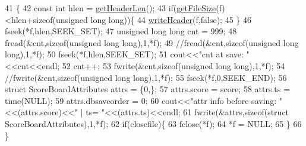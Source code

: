 \begin{DoxyCode}
41                                                                                 \{
42                 \textcolor{keyword}{const} \textcolor{keywordtype}{int} hlen = \hyperlink{class_tetris_1_1_d_b_management_1_1_d_b_manager2_acac0c763f7ff5fe5c5eda0c83e0b41bd}{getHeaderLen}();
43                 \textcolor{keywordflow}{if}(\hyperlink{class_tetris_1_1_d_b_management_1_1_d_b_manager2_a0ad4e60d498caefce46d9917f7593c9e}{getFileSize}(f)<hlen+\textcolor{keyword}{sizeof}(\textcolor{keywordtype}{unsigned} \textcolor{keywordtype}{long} \textcolor{keywordtype}{long}))\{
44                     \hyperlink{class_tetris_1_1_d_b_management_1_1_d_b_manager2_af814ba59852fbb4f3630149454c2d312}{writeHeader}(f,\textcolor{keyword}{false});
45                 \}
46                 fseek(*f,hlen,SEEK\_SET);
47                 \textcolor{keywordtype}{unsigned} \textcolor{keywordtype}{long} \textcolor{keywordtype}{long} cnt = 999;
48                 fread(&cnt,\textcolor{keyword}{sizeof}(\textcolor{keywordtype}{unsigned} \textcolor{keywordtype}{long} \textcolor{keywordtype}{long}),1,*f);
49                 \textcolor{comment}{//fread(&cnt,sizeof(unsigned long long),1,*f);}
50                 fseek(*f,hlen,SEEK\_SET);
51                 cout<<\textcolor{stringliteral}{"cnt at save: "}<<cnt<<endl;
52                 cnt++;
53                 fwrite(&cnt,\textcolor{keyword}{sizeof}(\textcolor{keywordtype}{unsigned} \textcolor{keywordtype}{long} \textcolor{keywordtype}{long}),1,*f);
54                 \textcolor{comment}{//fwrite(&cnt,sizeof(unsigned long long),1,*f);}
55                 fseek(*f,0,SEEK\_END);
56                 \textcolor{keyword}{struct }ScoreBoardAttributes attrs = \{0,\};
57                 attrs.score = score;
58                 attrs.ts = time(NULL);
59                 attrs.dbsaveorder = 0;
60                 cout<<\textcolor{stringliteral}{"attr info before saving: "}<<(attrs.score)<<\textcolor{stringliteral}{" | ts= "}<<(attrs.ts)<<endl;
61                 fwrite(&attrs,\textcolor{keyword}{sizeof}(\textcolor{keyword}{struct} ScoreBoardAttributes),1,*f);
62                 \textcolor{keywordflow}{if}(closefile)\{
63                     fclose(*f);
64                     *f = NULL;
65                 \}
66             \}
\end{DoxyCode}
\mbox{\label{class_tetris_1_1_d_b_management_1_1_d_b_manager2_af814ba59852fbb4f3630149454c2d312}} 
